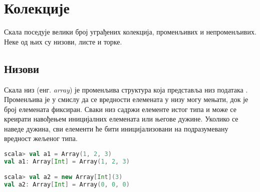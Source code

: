 \documentclass[12pt,oneside]{memoir}
\begin{document}
%
%
%

\section{Колекције}
\label{sec:scala_coll}

Скала поседује велики број уграђених колекција, променљивих и непроменљивих. Неке од њих су низови, листе и торке.

\subsection{Низови}
\label{subsec:scala_arrays}

Скала низ (енг. \textit{array}) је променљива структура која представља низ података \cite{scala_prog}. Променљива је у смислу да се вредности елемената у низу могу мењати, док је број елемената фиксиран. Сваки низ садржи елементе истог типа и може се креирати навођењем иницијалних елемената или његове дужине. Уколико се наведе дужина, сви елементи ће бити иницијализовани на подразумевану вредност жељеног типа.

\begin{lstlisting}[language=Scala, caption={Инстанцирање низа у Скали}, label={lst:scala_coll_array_example}, basicstyle=\small]
scala> val a1 = Array(1, 2, 3)
val a1: Array[Int] = Array(1, 2, 3)

scala> val a2 = new Array[Int](3)
val a2: Array[Int] = Array(0, 0, 0)
\end{lstlisting}
\end{document}
